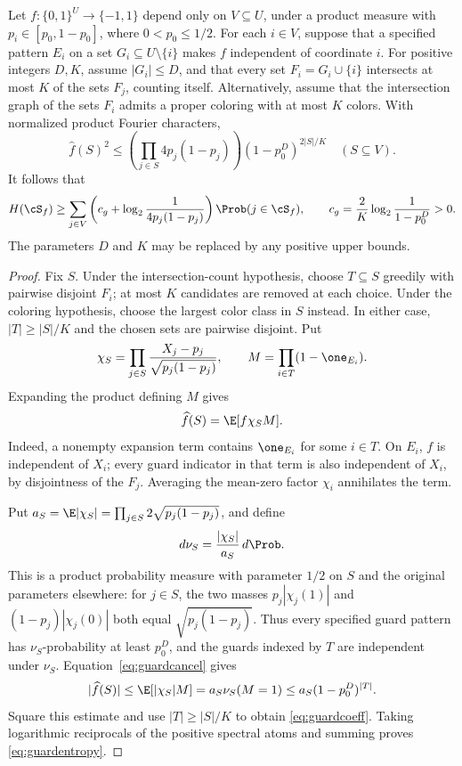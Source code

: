\begin{theorem}\label{thm:guards}
Let $f:\{0,1\}^U\to\{-1,1\}$ depend only on $V\subseteq U$, under a product measure with $p_i\in[p_0,1-p_0]$, where $0<p_0\le1/2$. For each $i\in V$, suppose that a specified pattern $E_i$ on a set $G_i\subseteq U\setminus\{i\}$ makes $f$ independent of coordinate $i$. For positive integers $D,K$, assume $|G_i|\le D$, and that every set $F_i=G_i\cup\{i\}$ intersects at most $K$ of the sets $F_j$, counting itself. Alternatively, assume that the intersection graph of the sets $F_i$ admits a proper coloring with at most $K$ colors. With normalized product Fourier characters,
\begin{equation}\label{eq:guardcoeff}
 \widehat f(S)^2\le
 \left(\prod_{j\in S}4p_j(1-p_j)\right)(1-p_0^D)^{2|S|/K}
 \quad(S\subseteq V).
\end{equation}
It follows that
\begin{equation}\label{eq:guardentropy}
 H(\cS_f)\ge\sum_{j\in V}
 \left(c_g+\log_2\frac1{4p_j(1-p_j)}\right)
 \Prob(j\in\cS_f),\qquad
 c_g=\frac{2}{K}\log_2\frac1{1-p_0^D}>0.
\end{equation}
The parameters $D$ and $K$ may be replaced by any positive upper bounds.
\end{theorem}
\begin{proof}
Fix $S$. Under the intersection-count hypothesis, choose $T\subseteq S$ greedily with pairwise disjoint $F_i$; at most $K$ candidates are removed at each choice. Under the coloring hypothesis, choose the largest color class in $S$ instead. In either case, $|T|\ge|S|/K$ and the chosen sets are pairwise disjoint. Put
\[
 \chi_S=\prod_{j\in S}\frac{X_j-p_j}{\sqrt{p_j(1-p_j)}},
 \qquad M=\prod_{i\in T}(1-\one_{E_i}).
\]
Expanding the product defining $M$ gives
\begin{equation}\label{eq:guardcancel}
 \widehat f(S)=\E[f\chi_S M].
\end{equation}
Indeed, a nonempty expansion term contains $\one_{E_i}$ for some $i\in T$. On $E_i$, $f$ is independent of $X_i$; every guard indicator in that term is also independent of $X_i$, by disjointness of the $F_j$. Averaging the mean-zero factor $\chi_i$ annihilates the term.

Put $a_S=\E|\chi_S|=\prod_{j\in S}2\sqrt{p_j(1-p_j)}$, and define
\[
 d\nu_S=\frac{|\chi_S|}{a_S}\,d\Prob.
\]
This is a product probability measure with parameter $1/2$ on $S$ and the original parameters elsewhere: for $j\in S$, the two masses $p_j|\chi_j(1)|$ and $(1-p_j)|\chi_j(0)|$ both equal $\sqrt{p_j(1-p_j)}$. Thus every specified guard pattern has $\nu_S$-probability at least $p_0^D$, and the guards indexed by $T$ are independent under $\nu_S$. Equation~\eqref{eq:guardcancel} gives
\[
 |\widehat f(S)|\le\E[|\chi_S|M]
 =a_S\nu_S(M=1)\le a_S(1-p_0^D)^{|T|}.
\]
Square this estimate and use $|T|\ge|S|/K$ to obtain \eqref{eq:guardcoeff}. Taking logarithmic reciprocals of the positive spectral atoms and summing proves \eqref{eq:guardentropy}.
\end{proof}

